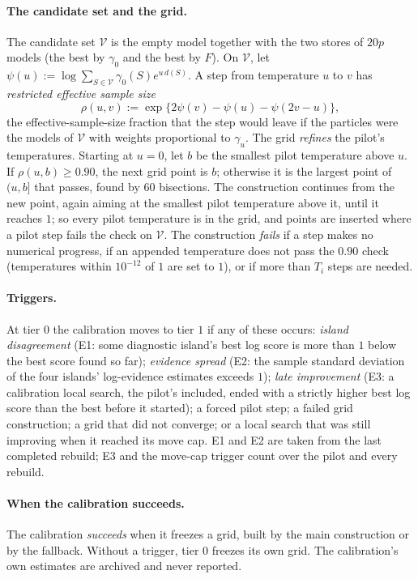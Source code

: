 \documentclass[11pt]{article}
\begin{document}
\paragraph{The candidate set and the grid.} The candidate set $\mathcal V$ is the empty model together with the two stores
of $20p$ models (the best by $\gamma_0$ and the best by $F$). On $\mathcal V$, let
$\psi(u):=\log\sum_{S\in\mathcal V}\gamma_0(S)e^{u\,d(S)}$. A step from temperature $u$ to $v$ has \emph{restricted effective
sample size}
\[
  \rho(u,v):=\exp\{2\psi(v)-\psi(u)-\psi(2v-u)\},
\]
the effective-sample-size fraction that the step would leave if the particles were the models of $\mathcal V$ with
weights proportional to $\gamma_u$. The grid \emph{refines} the pilot's temperatures. Starting at $u=0$, let $b$ be the
smallest pilot temperature above $u$. If $\rho(u,b)\ge0.90$, the next grid point is $b$; otherwise it is the largest
point of $(u,b]$ that passes, found by 60 bisections. The construction continues from the new point, again aiming at the
smallest pilot temperature above it, until it reaches $1$; so every pilot temperature is in the grid, and points are
inserted where a pilot step fails the check on $\mathcal V$. The construction \emph{fails} if a step
makes no numerical progress, if an appended temperature does not pass the $0.90$ check (temperatures within $10^{-12}$ of
$1$ are set to $1$), or if more than $T_i$ steps are needed.

\paragraph{Triggers.} At tier $0$ the calibration moves to tier $1$ if any of these occurs: \emph{island disagreement}
(E1: some diagnostic island's best log score is more than $1$ below the best score found so far); \emph{evidence
spread} (E2: the sample standard deviation of the four islands' log-evidence estimates exceeds $1$); \emph{late
improvement} (E3: a calibration local search, the pilot's included, ended with a strictly higher best log score than the
best before it started); a forced pilot step; a failed grid construction; a grid
that did not converge; or a local search that was still improving when it reached its move cap. E1 and E2 are taken from
the last completed rebuild; E3 and the move-cap trigger count over the pilot and every rebuild.

\paragraph{When the calibration succeeds.} The calibration \emph{succeeds} when it freezes a grid, built by the main
construction or by the fallback. Without a trigger, tier $0$ freezes its own grid. The calibration's own estimates are
archived and never reported.
\end{document}
